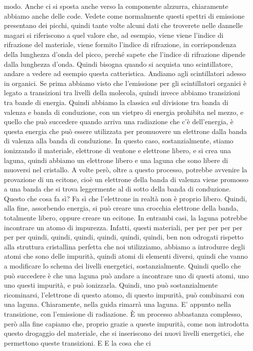 modo. Anche ci si sposta anche verso la componente alzzurra, chiaramente abbiamo anche delle code. Vedete come normalmente questi spettri di emissione presentano dei picchi, quindi tante volte alcuni dati che troverete nelle dannelle magari si riferiscono a quel valore che, ad esempio, viene viene l'indice di rifrazione del materiale, viene formito l'indice di rifrazione, in corrispondenza della lunghezza d'onda del picco, perché sapete che l'indice di rifrazione dipende dalla lunghezza d'onda. Quindi bisogna quando si acquista uno scintillatore, andare a vedere ad esempio questa catteristica. Andiamo agli scintillatori adesso in organici. Se prima abbiamo visto che l'emissione per gli scintillatori organici è legato a transizioni tra livelli della molecola, quindi invece abbiamo transizioni tra bande di energia. Quindi abbiamo la classica sul divisione tra banda di valenza e banda di conduzione, con un vietpro di energia prohibita nel mezzo, e quello che può succedere quando arriva una radiazione che c'è dell'energia, è questa energia che può essere utilizzata per promuovere un elettrone dalla banda di valenza alla banda di conduzione. In questo caso, sostanzialmente, stiamo ionizzando il materiale, elettrone di ventone e elettrone libero, e si crea una laguna, quindi abbiamo un elettrone libero e una laguna che sono libere di muoversi nel cristallo. A volte però, oltre a questo processo, potrebbe avvenire la provazione di un ecitone, cioè un elettrone della banda di valenza viene promosso a una banda che si trova leggermente al di sotto della banda di conduzione. Questo che cosa fa sì? Fa sì che l'elettrone in realtà non è proprio libero. Quindi, alla fine, assorbendo energia, si può creare una crocchia elettrone della banda, totalmente libero, oppure creare un ecitone. In entrambi casi, la laguna potrebbe incontrare un atomo di impurezza. Infatti, questi materiali, per per per per per per per quindi, quindi, quindi, quindi, quindi, quindi, ben non odrogati rispetto alla struttura cristallina perfetta che noi utilizziamo, abbiamo a introdurre degli atomi che sono delle impurità, quindi atomi di elementi diversi, quindi che vanno a modificare lo schema dei livelli energetici, sostanzialmente. Quindi quello che può succedere è che una laguna può andare a incontrare uno di questi atomi, uno uno questi impurità, e può ionizzarla. Quindi, uno può sostanzialmente ricominarsi, l'elettrone di questo atomo, di questo impurità, può combinarsi con una laguna. Chiaramente, nella guida rimarrà una laguna. E' appunto nella transizione, con l'emissione di radiazione. È un processo abbastanza complesso, però alla fine capiamo che, proprio grazie a queste impurità, come non introdotta questo drogaggio del materiale, che si inseriscono dei nuovi livelli energetici, che permettono queste transizioni. E E la cosa che ci 

